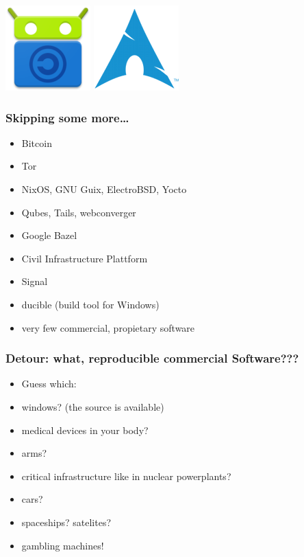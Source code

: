 \documentclass[14pt,aspectratio=169]{beamer}
\begin{document}
\begin{frame}
\begin{center}
  \hspace{0.05\paperwidth}
  \includegraphics[height=0.13\paperheight]{images/f-droid.png}
  \hspace{0.05\paperwidth}
  \includegraphics[height=0.13\paperheight]{images/archlinux.png}
\end{center}
\end{frame}


\begin{frame}
 \frametitle{Skipping some more…}
 \begin{itemize}
\item Bitcoin
\item Tor
\item NixOS, GNU Guix, ElectroBSD, Yocto
\item Qubes, Tails, webconverger
\item Google Bazel
\item Civil Infrastructure Plattform
\item Signal
\item ducible (build tool for Windows)
\item very few commercial, propietary software
 \end{itemize}
\end{frame}


\begin{frame}
 \frametitle{Detour: what, reproducible commercial Software???}
 \begin{itemize}
\item Guess which:
\item <2-3>   windows? (the source is available)
\item <2-3>   medical devices in your body?
\item <2-3>   arms?
\item <2-3>   critical infrastructure like in nuclear powerplants?
\item <2-3>   cars?
\item <2-3>   spaceships? satelites?
\item <3> gambling machines!
 \end{itemize}
\end{frame}
\end{document}
